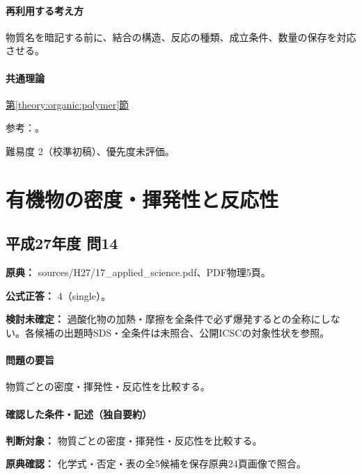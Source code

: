 \paragraph{再利用する考え方} 物質名を暗記する前に、結合の構造、反応の種類、成立条件、数量の保存を対応させる。

\paragraph{共通理論} \hyperref[theory:organic:polymer]{第\ref*{theory:organic:polymer}節}

\par 参考：\cite{organic_physical,organic_step,organic_jbpa}。

\par 難易度 2（校準初稿）、優先度未評価。

\section{有機物の密度・揮発性と反応性}

\subsection{平成27年度 問14}
\label{q:h27-reg-applied-14}

\noindent\textbf{原典：} sources/H27/17\_applied\_science.pdf、PDF物理5頁。

\textbf{公式正答：} 4（single）。

\par\textbf{検討未確定：} 過酸化物の加熱・摩擦を全条件で必ず爆発するとの全称にしない。各候補の出題時SDS・全条件は未照合、公開ICSCの対象性状を参照。

\paragraph{問題の要旨} 物質ごとの密度・揮発性・反応性を比較する。

\paragraph{確認した条件・記述（独自要約）}\mbox{}\par

\noindent\textbf{判断対象：} 物質ごとの密度・揮発性・反応性を比較する。\par

\noindent\textbf{原典確認：} 化学式・否定・表の全5候補を保存原典24頁画像で照合。\par

